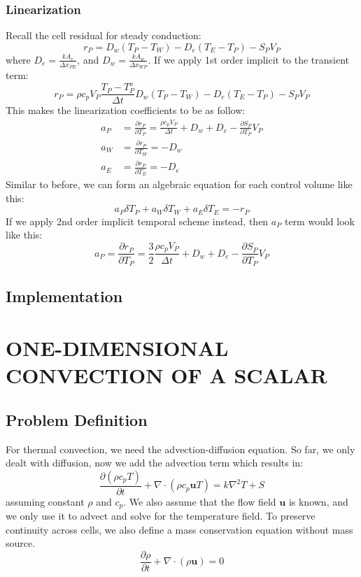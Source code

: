 \documentclass[11pt]{article}
\begin{document}
\subsubsection{Linearization}
\label{sec:org4dd0841}
Recall the cell residual for steady conduction:
\begin{equation*}
r_P = D_w (T_P - T_W) - D_e (T_E - T_P) - S_PV_P
\end{equation*}
where \(D_e = \frac{kA_e}{\Delta x_{PE}}\), and \(D_w = \frac{kA_w}{\Delta x_{WP}}\).
If we apply 1st order implicit to the transient term:
\begin{equation*}
r_P = \rho c_p V_P \frac{T_P-T_P^o}{\Delta t}D_w (T_P - T_W) - D_e (T_E - T_P) - S_PV_P
\end{equation*}
This makes the linearization coefficients to be as follow:
\begin{align*}
a_P &= \frac{\partial r_P}{\partial T_P} = \frac{\rho c_p V_P}{\Delta t} + D_w + D_e - \frac{\partial S_P}{\partial T_P}V_P\\
a_W &= \frac{\partial r_P}{\partial T_W} = -D_w\\
a_E &= \frac{\partial r_P}{\partial T_E} = -D_e  
\end{align*}
Similar to before, we can form an algebraic equation for each control volume like this:
\begin{equation}
a_P\delta T_P + a_W\delta T_W + a_E \delta T_E = -r_P 
\end{equation}
If we apply 2nd order implicit temporal scheme instead, then \(a_P\) term would look like this:
\begin{equation*}
a_P = \frac{\partial r_P}{\partial T_P} = \frac{3}{2}\frac{\rho c_p V_P}{\Delta t} + D_w + D_e - \frac{\partial S_P}{\partial T_P}V_P
\end{equation*}
\subsection{Implementation}
\label{sec:org218671c}

\clearpage
\section{ONE-DIMENSIONAL CONVECTION OF A SCALAR}
\label{sec:org017b02e}
\subsection{Problem Definition}
\label{sec:org4a0b290}
For thermal convection, we need the advection-diffusion equation. So far, we only dealt with diffusion, now we add
the advection term which results in:
\begin{equation}
\frac{\partial (\rho c_p T)}{\partial t} + \nabla \cdot (\rho c_p \textbf{u}T) = k \nabla^2 T + S
\end{equation}
assuming constant \(\rho\) and \(c_p\). We also assume that the flow field \(\textbf{u}\) is known,
and we only use it to advect and solve for the temperature field. To preserve continuity across cells, we also
define a mass conservation equation without mass source.
\begin{equation}
\frac{\partial \rho}{\partial t} + \nabla \cdot (\rho \textbf{u}) = 0
\end{equation}
\end{document}

